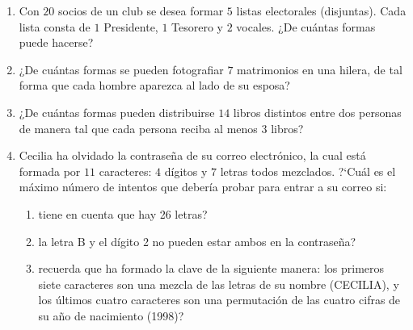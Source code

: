 \documentclass[a4paper,12pt,twoside,spanish,reqno]{amsbook}
\numberwithin{equation}{section}
\begin{document}
\begin{enumerate}[resume]

\item Con $20$ socios de un club se desea formar $5$ listas electorales (disjuntas).
Cada lista consta de $1$ Presidente, $1$ Tesorero y $2$ vocales.  ¿De cuántas
formas puede hacerse?


\item ¿De cuántas formas se pueden fotografiar $7$ matrimonios en una hilera,
de tal forma que cada hombre aparezca al lado de su esposa?


\item ¿De cuántas formas pueden distribuirse $14$ libros distintos entre dos
personas de manera tal que cada persona reciba al menos $3$ libros?

\item Cecilia ha olvidado la contraseña de su correo electrónico, la cual est\'a formada por $11$ caracteres: $4$ d\'igitos y $7$ letras todos mezclados. ?`Cu\'al es el m\'aximo n\'umero de intentos que deber\'ia probar para entrar a su correo si:
\begin{enumerate}
    \item  tiene en cuenta que hay 26 letras?
    
    \item la letra B y el d\'igito 2 no pueden estar ambos en la contraseña?
    
    \item  recuerda que ha formado la clave de la siguiente manera: los primeros siete caracteres son una mezcla de las letras de su nombre (CECILIA), y los \'ultimos cuatro caracteres son una permutaci\'on de las cuatro cifras de su a\~no de nacimiento (1998)?
\end{enumerate}


\end{enumerate}
\end{document}
